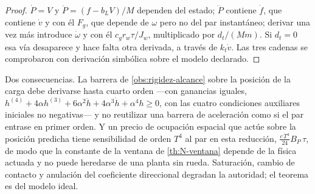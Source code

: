 \begin{proof}
$\dot P=V$ y $\ddot P=(f-b_LV)/M$ dependen del estado; $\dddot P$ contiene
$\dot f$, que contiene $\dot v$ y con él $F_g$, que depende de $\omega$ pero no
del par instantáneo; derivar una vez más introduce $\dot\omega$ y con él
$c_gr_w\tau/J_w$, multiplicado por $d_t/(Mm)$. Si $d_t=0$ esa vía desaparece
y hace falta otra derivada, a través de $k_t\dot v$. Las tres cadenas se
comprobaron con derivación simbólica sobre el modelo declarado.
\end{proof}

\begin{observacion}
\label{obs:grado-cuatro}
Dos consecuencias. La barrera de \cref{obs:rigidez-alcance} sobre la
posición de la carga debe derivarse hasta cuarto orden —con ganancias iguales,
$h^{(4)}+4\alpha h^{(3)}+6\alpha^2\ddot h+4\alpha^3\dot h+\alpha^4h\ge0$, con
las cuatro condiciones auxiliares iniciales no negativas— y no reutilizar una
barrera de aceleración como si el par entrase en primer orden. Y un precio de
ocupación espacial que actúe sobre la posición predicha tiene sensibilidad de
orden $T^4$ al par en esta reducción, $\tfrac{c\,T^4}{24}B_P\,\tau$, de modo
que la constante de la ventana de \cref{th:N-ventana} depende de la física
actuada y no puede heredarse de una planta sin rueda. Saturación, cambio de
contacto y anulación del coeficiente direccional degradan la autoridad; el
teorema es del modelo ideal.
\end{observacion}
